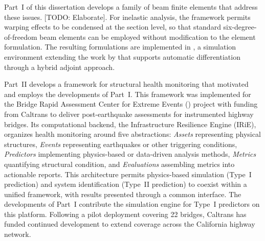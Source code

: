 Part~I of this dissertation develops a family of beam finite elements that address these issues. 
[TODO: Elaborate].
For inelastic analysis, the framework permits warping effects to be condensed at the section level, so that standard six-degree-of-freedom beam elements can be employed without modification to the element formulation.
The resulting formulations are implemented in \Xara{}, a simulation environment extending the work by \cite{mckenna1997object} that supports automatic differentiation through a hybrid adjoint approach.



Part~II develops a framework for structural health monitoring that motivated and employs the developments of Part~I. 
This framework was implemented for the Bridge Rapid Assessment Center for Extreme Events (\BRACE{}) project with funding from Caltrans to deliver post-earthquake assessments for instrumented highway bridges.
Its computational backend, the Infrastructure Resilience Engine (IRiE), organizes health monitoring around five abstractions: \emph{Assets} representing physical structures, \emph{Events} representing earthquakes or other triggering conditions, \emph{Predictors} implementing physics-based or data-driven analysis methods, \emph{Metrics} quantifying structural condition, and \emph{Evaluations} assembling metrics into actionable reports.
This architecture permits physics-based simulation (Type~I prediction) and system identification (Type~II prediction) to coexist within a unified framework, with results presented through a common interface.
The developments of Part~I contribute the simulation engine for Type~I predictors on this platform.
Following a pilot deployment covering 22 bridges, Caltrans has funded continued development to extend coverage across the California highway network.




